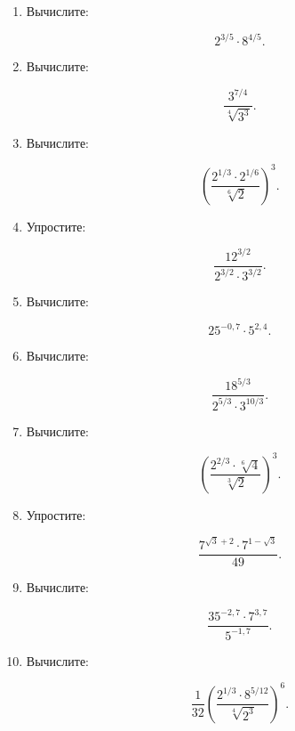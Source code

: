 \documentclass[a4paper,12pt]{article}
\begin{document}
\begin{enumerate}


  \item Вычислите:

  \[
  2^{3/5}\cdot8^{4/5}.
  \]

  \item Вычислите:

  \[
  \frac{3^{7/4}}
  {\sqrt[4]{3^3}}.
  \]

  \item Вычислите:

  \[
  \left(
  \frac{2^{1/3}\cdot2^{1/6}}
  {\sqrt[6]{2}}
  \right)^3.
  \]


  \item Упростите:

  \[
  \frac{12^{3/2}}
  {2^{3/2}\cdot3^{3/2}}.
  \]

  \item Вычислите:

  \[
  25^{-0{,}7}\cdot5^{2{,}4}.
  \]

  \item Вычислите:

  \[
  \frac{18^{5/3}}
  {2^{5/3}\cdot3^{10/3}}.
  \]

  \item Вычислите:

  \[
  \left(
  \frac{
    2^{2/3}\cdot\sqrt[6]{4}
  }
  {
    \sqrt[3]{2}
  }
  \right)^3.
  \]

  \item Упростите:

  \[
  \frac{
    7^{\sqrt3+2}\cdot7^{1-\sqrt3}
  }
  {49}.
  \]

  \item Вычислите:

  \[
  \frac{
    35^{-2{,}7}\cdot7^{3{,}7}
  }
  {
    5^{-1{,}7}
  }.
  \]


  \item Вычислите:

  \[
  \frac{1}{32}
  \left(
  \frac{
    2^{1/3}\cdot8^{5/12}
  }
  {
    \sqrt[4]{2^3}
  }
  \right)^6.
  \]

\end{enumerate}
\end{document}
